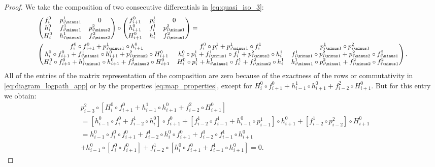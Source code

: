 %
\begin{proof}
We take the composition of two consecutive differentials in \eqref{eq:quasi_iso_3}:
\begin{equation*} \small
\begin{aligned}
&\begin{pmatrix}f_i^0 & p_{i\minus 1}^1 & 0 \\ h_i^0 & f_{i\minus 1}^1 & p_{i\minus 2}^2 \\ H_i^0 & h_{i\minus 1}^1 & f_{i\minus 2}^2 \end{pmatrix}\circ\begin{pmatrix}f_{i+1}^0 & p_{i}^1 & 0 \\ h_{i+1}^0 & f_{i}^1 & p_{i\minus 1}^2 \\ H_{i+1}^0 & h_{i}^1 & f_{i\minus 1}^2 \end{pmatrix}= \\ &\begin{pmatrix}f_i^0\circ f_{i+1}^0+p_{i\minus 1}^1\circ h_{i+1}^0 & f_i^0\circ p_i^1+p_{i\minus 1}^1\circ f_i^1 & p_{i\minus 1}^1\circ p_{i\minus 1}^2 \\ h_i^0\circ f_{i+1}^0+f_{i\minus 1}^1\circ h_{i+1}^0+p_{i\minus 2}^2\circ H_{i+1}^0 & h_i^0\circ p_i^1+f_{i\minus 1}^1\circ f_i^1+p_{i\minus 2}^2\circ h_i^1 & f_{i\minus 1}^1\circ p_{i\minus 1}^2+p_{i\minus 2}^2\circ f_{i\minus 1}^2 \\ H_i^0\circ f_{i+1}^0 + h_{i\minus 1}^1\circ h_{i+1}^0 +  f_{i\minus 2}^2\circ H_{i+1}^0 & H_i^0\circ p_i^1 + h_{i\minus 1}^1\circ f_i^1 +  f_{i\minus 2}^2\circ h_i^1 & h_{i\minus 1}^1\circ p_{i\minus 1}^2 +  f_{i\minus 2}^2\circ f_{i\minus 1}^2 \end{pmatrix}.
\end{aligned}
\end{equation*}
All of the entries of the matrix representation of the composition are zero because of the exactness of the rows or commutativity in \eqref{eq:diagram_logpath_app} or by the properties \eqref{eq:map_properties}, except for $H_i^0\circ f_{i+1}^0 + h_{i\minus 1}^1\circ h_{i+1}^0 + f_{i\minus 2}^2\circ H_{i+1}^0$. But for this entry we obtain:
\begin{equation*}
\begin{aligned}
& p_{i\minus 3}^2\circ \left[H_i^0\circ f_{i+1}^0 + h_{i\minus 1}^1\circ h_{i+1}^0 + f_{i\minus 2}^2\circ H_{i+1}^0\right] \\ &=  \left[ h_{i\minus 1}^0\circ f_{i}^0 + f_{i\minus 2}^1\circ h_{i}^0 \right] \circ f_{i+1}^0  +  \left[ f_{i\minus 2}^1\circ f_{i\minus 1}^1+h_{i\minus 1}^0\circ p_{i\minus 1}^1 \right]\circ h_{i+1}^0 + \left[ f_{i\minus 2}^1\circ p_{i\minus 2}^2 \right]\circ H_{i+1}^0 \\ & = h_{i\minus 1}^0\circ f_{i}^0\circ f_{i+1}^0 + f_{i\minus 2}^1\circ h_{i}^0\circ f_{i+1}^0 +f_{i\minus 2}^1\circ f_{i\minus 1}^1\circ h_{i+1}^0 \\&+ h_{i\minus 1}^0\circ\left[ f_{i}^0\circ f_{i+1}^0\right]+f_{i\minus 2}^1\circ\left[ h_i^0\circ f_{i+1}^0+f_{i\minus 1}^1\circ h_{i+1}^0 \right]=0.

\end{aligned}
\end{equation*}
\end{proof}
